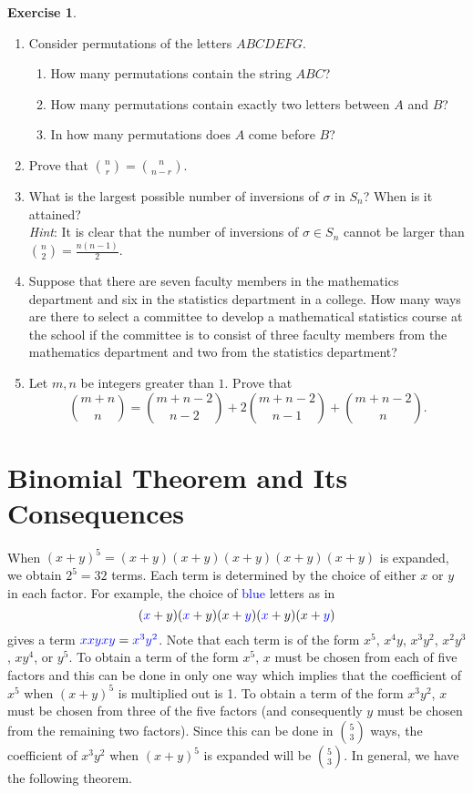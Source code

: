 \documentclass[12pt,letterpaper]{book}
\def\blue{\textcolor{blue}}
\numberwithin{equation}{section}
\theoremstyle{definition}
\newtheorem{exercise}{\textbf{Exercise}}[chapter]
\begin{document}
\begin{exercise}\label{counting part exer}\quad
\begin{enumerate}[\bfseries 1.]
\item Consider permutations of the letters $ABCDEFG$.
\begin{enumerate}
\item How many permutations contain the string $ABC$?
\item How many permutations contain exactly two letters between $A$ and $B$?
\item In how many permutations does $A$ come before $B$?
\end{enumerate}
\item\label{binomial interchange} Prove that ${n\choose r}={n \choose n-r}$.
\item What is the largest possible number of inversions of $\sigma$ in $S_n$? When is it attained?\\
\textit{Hint}: It is clear that the number of inversions of $\sigma\in S_n$ cannot be larger than ${n \choose 2}=\frac{n(n-1)}{2}$.
\item Suppose that there are seven faculty members in the mathematics department and six in the statistics department in a college. How many ways are there to select a committee to develop a mathematical statistics course at the school if the committee is to consist of three faculty members from the mathematics department and two from the statistics department?
\item Let $m,n$ be integers greater than $1$. Prove that
$${m+n \choose n}={m+n-2 \choose n-2}+2{m+n-2 \choose n-1}+{m+n-2 \choose n}.$$
\end{enumerate}
\end{exercise}

\section{Binomial Theorem and Its Consequences}

When $(x+y)^5=(x+y)(x+y)(x+y)(x+y)(x+y)$ is expanded, we obtain $2^5=32$ terms. Each term is determined by the choice of either $x$ or $y$ in each factor. For example, the choice of \blue{blue} letters as in
$$(\blue{x}+y)(\blue{x}+y)(x+\blue{y})(\blue{x}+y)(x+\blue{y})$$
gives a term $\blue{xxyxy}=\blue{x^3y^2}$. Note that each term is of the form $x^5$, $x^4y$, $x^3y^2$, $x^2y^3$, $xy^4$, or $y^5$. To obtain a term of the form $x^5$, $x$ must be chosen from each of five factors and this can be done in only one way which implies that the coefficient of $x^5$ when $(x+y)^5$ is multiplied out is 1. To obtain a term of the form $x^3y^2$, $x$ must be chosen from three of the five factors (and consequently $y$ must be chosen from the remaining two factors). Since this can be done in $5 \choose 3$ ways, the coefficient of $x^3y^2$ when $(x+y)^5$ is expanded will be $5 \choose 3$. In general, we have the following theorem.
\end{document}
